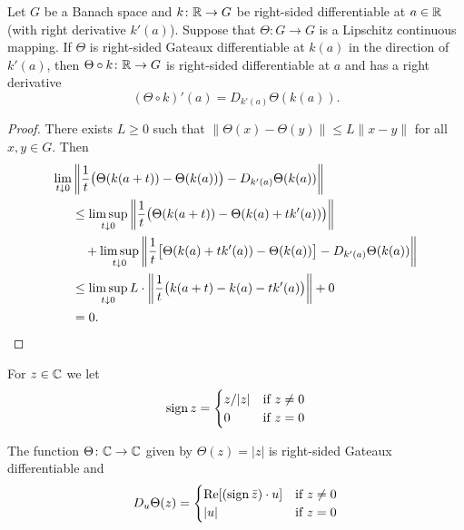 \begin{proposition}\label{prop:b2-2.3}
Let $G$ be a Banach space and $k \colon \mathbb{R} \to G$ be right-sided differentiable at $a \in \mathbb{R}$ (with right derivative $k'(a)$).
Suppose that $\Theta \colon G \to G$ is a Lipschitz continuous mapping.
If\/ $\Theta$ is right-sided Gateaux differentiable at $k(a)$ in the direction of\/ $k'(a)$, then $\Theta \circ k \colon \mathbb{R} \to G$ is right-sided differentiable at $a$ and has a right derivative
\begin{equation}\label{eq:b2-2.4}
(\Theta \circ k)'(a) = D_{k'(a)}\Theta(k(a)).
\end{equation}
\end{proposition}
\begin{proof}
There exists $L \geq 0$ such that $\|\Theta(x) - \Theta(y)\| \leq L\|x - y\|$ for all $x,y \in G$.
Then
\[
\begin{aligned}
\lim_{t \downarrow 0} &\left\|\frac{1}{t} \bigl(\Theta(k(a+t)) - \Theta(k(a))\bigr) - D_{k'(a)}\Theta(k(a))\right\| \\
&\leq \limsup_{t \downarrow 0} \left\|\frac{1}{t} \bigl(\Theta(k(a+t)) - \Theta(k(a)+tk'(a))\bigr)\right\| \\
&\quad + \limsup_{t \downarrow 0} \left\|\frac{1}{t} \bigl[\Theta(k(a)+tk'(a)) - \Theta(k(a))\bigr] - D_{k'(a)}\Theta(k(a))\right\| \\
&\leq \limsup_{t \downarrow 0} L \cdot \left\|\frac{1}{t} \bigl(k(a+t) - k(a)-tk'(a)\bigr)\right\| + 0 \\
&= 0.
\qedhere
\end{aligned}
\]
\end{proof}
For $z \in \mathbb{C}$ we let
\begin{equation}\label{eq:b2-2.5}
\operatorname{sign} z = \begin{cases}
    z/|z| & \text{if } z \neq 0 \\
    0 & \text{if } z = 0
\end{cases}
\end{equation}
\begin{lemma}\label{lem:b2-2.4}
The function $\Theta \colon \mathbb{C} \to \mathbb{C}$ given by $\Theta(z) = |z|$ is right-sided Gateaux differentiable and
\begin{equation}\label{eq:b2-2.6}
D_{u}\Theta(z) = \begin{cases}
    \mathop{}\!\mathrm{Re}[(\operatorname{sign} \bar{z}) \cdot u] & \text{if } z \neq 0 \\
    |u| & \text{if } z = 0
\end{cases}
\end{equation}
\end{lemma}
